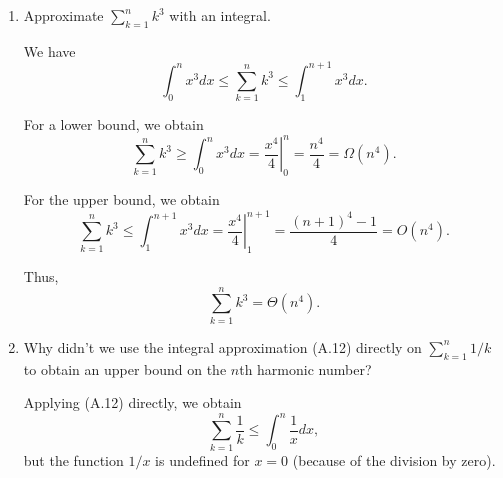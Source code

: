 \documentclass{report}
\makeatletter
\renewenvironment{framed}{%
 \def\FrameCommand##1{\hskip\@totalleftmargin
 \fboxsep=\FrameSep\fbox{##1}}%
 \MakeFramed {\advance\hsize-\width
   \@totalleftmargin\z@ \linewidth\hsize
   \@setminipage}}%
 {\par\unskip\endMakeFramed}
\DeclarePairedDelimiter{\floor}{\lfloor}{\rfloor}
\newcommand*\Eval[3]{\left.#1\right\rvert_{#2}^{#3}}
\makeatother
\begin{document}
\begin{enumerate}
\begin{framed}
\begin{equation*}
\begin{aligned}
  \sum_{k = 1}^n \frac{1}{k} &\ge \sum_{i = 0}^{\floor{\lg n} - 1} \sum_{j = 0}^{2^i - 1} \frac{1}{2^i + j}\\
                             &\ge \sum_{i = 0}^{\floor{\lg n} - 1} \sum_{j = 0}^{2^i - 1} \frac{1}{2^{i + 1}}\\
                             &=   \sum_{i = 0}^{\floor{\lg n} - 1} \frac{1}{2} \cdot \sum_{j = 0}^{2^i - 1} \frac{1}{2^{i}}\\
                             &=   \sum_{i = 0}^{\floor{\lg n} - 1} \frac{1}{2}\\
                             &\ge \sum_{i = 0}^{\lg n - 2} \frac{1}{2}\\
                             &=   \frac{1}{2} (\lg (n) - 1)\\
                             &=   \Omega(\lg n).
\end{aligned}
\end{equation*}
\end{framed}

\newpage

\item[A.2{-}4] {Approximate $\sum_{k = 1}^{n} k^3$ with an integral.}

\begin{framed}
We have
\[
  \int_{0}^{n} x^3 dx \le \sum_{k = 1}^{n} k^3 \le \int_{1}^{n + 1} x^3 dx.
\]

For a lower bound, we obtain
\[
  \sum_{k = 1}^{n} k^3 \ge \int_{0}^{n} x^3 dx = \Eval{\frac{x^4}{4}}{0}{n} = \frac{n^4}{4} = \Omega(n^4).
\]

For the upper bound, we obtain
\[
  \sum_{k = 1}^{n} k^3 \le \int_{1}^{n + 1} x^3 dx = \Eval{\frac{x^4}{4}}{1}{n + 1} = \frac{(n + 1)^4 - 1}{4} = O(n^4).
\]

Thus,
\[
  \sum_{k = 1}^{n} k^3 = \Theta(n^4).
\]


\end{framed}

\item[A.2{-}5] {Why didn't we use the integral approximation (A.12) directly on
$\sum_{k = 1}^{n} 1/k$ to obtain an upper bound on the $n$th harmonic number?}

\begin{framed}
Applying (A.12) directly, we obtain
\[
  \sum_{k = 1}^{n} \frac{1}{k} \le \int_{0}^{n} \frac{1}{x} dx,
\]
but the function $1/x$ is undefined for $x = 0$ (because of the division by
zero).
\end{framed}

\end{enumerate}
\end{document}
